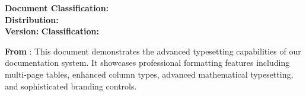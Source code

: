\documentclass[a4paper,11pt]{article}
\newcommand{\companyName}{Lagen}
\begin{document}
{{        \coverauthor{\AuthorPlaceholder}
        
        \vspace{0.2in}
        
        \begin{center}
        \color{accent}
        \fontsize{16}{20}\selectfont\bfseries\sffamily
        \DatePlaceholder
        \end{center}
        
        \vfill
        
        \begin{center}
        \end{center}
        
        \vspace{0.3in}
        
        \begin{classificationbox}
        \centering
        \footnotesize\sffamily
        \textbf{Document Classification:} \ClassificationPlaceholder\\
        \textbf{Distribution:} \DistributionPlaceholder\\
        \textbf{Version:} \VersionPlaceholder \quad 
        \textbf{Classification:} \ClassificationLevelPlaceholder
        \end{classificationbox}
    }{}
    
    \newpage
}

\maketitle
\thispagestyle{empty}

\begin{infobox}
\textbf{From \brandname{\companyName}}: This document demonstrates the advanced typesetting capabilities of our  documentation system. It showcases professional formatting features including multi-page tables, enhanced column types, advanced mathematical typesetting, and sophisticated branding controls.
\end{infobox}
\end{document}
